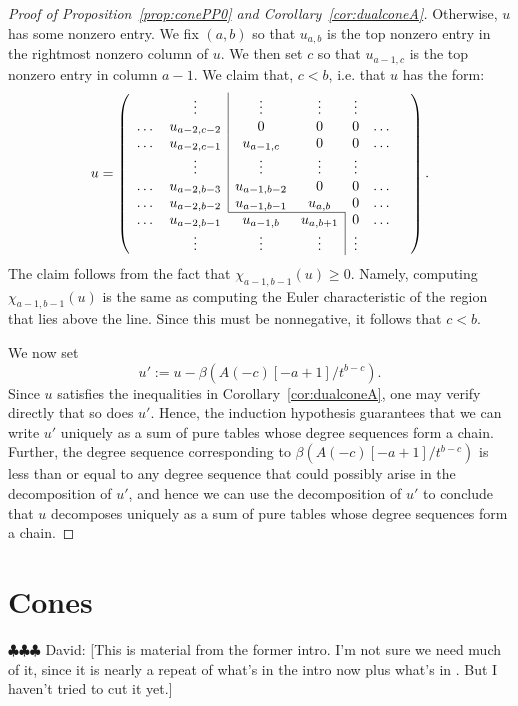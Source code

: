 \documentclass[12pt]{amsart}
\theoremstyle{definition}
\theoremstyle{remark}
\newcommand{\david}[1]{{\color{red} \sf $\clubsuit\clubsuit\clubsuit$ David: [#1]}}
\begin{document}
\begin{proof}[Proof of Proposition~\ref{prop:conePP0} and Corollary~\ref{cor:dualconeA}]
Otherwise, $u$ has some nonzero entry.  We fix $(a,b)$ so that $u_{a,b}$ is the top nonzero entry in the rightmost nonzero column of $u$.  We then set $c$ so that $u_{a-1,c}$ is the top nonzero entry in column $a-1$.  We claim that, $c<b$, i.e. that $u$ has the form:
\[
u=
\left(
\begin{array}{ccccccc}
 & \vdots& \multicolumn{1}{|c}{\vdots}&\vdots& \vdots&&\\
\dots&u_{a-2,c-2}&\multicolumn{1}{|c}{0}&0&0&\dots\\
\dots&u_{a-2,c-1}&\multicolumn{1}{|c}{u_{a-1,c}}&0&0&\dots\\
 & \vdots& \multicolumn{1}{|c}{\vdots}&\vdots& \vdots&&\\
\dots&u_{a-2,b-3}&\multicolumn{1}{|c}{u_{a-1,b-2}}&0&0&\dots\\
\dots&u_{a-2,b-2}&\multicolumn{1}{|c}{u_{a-1,b-1}}&u_{a,b}&0&\dots\\ \cline{3-4}
\dots&u_{a-2,b-1}&u_{a-1,b}&u_{a,b+1}&\multicolumn{1}{|c}{0}&\dots\\
& \vdots&\vdots&\vdots& \multicolumn{1}{|c}{\vdots}&&\\
\end{array}\right).
\]
The claim follows from the fact that $\chi_{a-1,b-1}(u)\geq 0$.  Namely, computing $\chi_{a-1,b-1}(u)$
is the same as computing the Euler characteristic of the region that lies above the line.  Since this must be nonnegative,
it follows that $c<b$.

We now set
\[
u':=u-\beta(A(-c)[-a+1]/t^{b-c}).
\]
Since $u$ satisfies the inequalities in Corollary~\ref{cor:dualconeA}, one may verify directly that so does $u'$.  Hence, the induction hypothesis guarantees that we can write $u'$ uniquely as a sum of pure tables whose degree sequences form a chain.  Further, the degree sequence corresponding to $\beta(A(-c)[-a+1]/t^{b-c})$ is less than or equal to any degree sequence that could possibly arise in the decomposition of $u'$, and hence we can use the decomposition of $u'$ to conclude that $u$ decomposes uniquely as a sum of pure tables whose degree sequences form a chain.
\end{proof}

\section{Cones}
\david{This is material from the former intro. I'm not sure we need much of it, since it
is nearly a repeat of what's in the intro now plus what's in \cite{eis-schrey1}. But I haven't
tried to cut it yet.}
\end{document}
